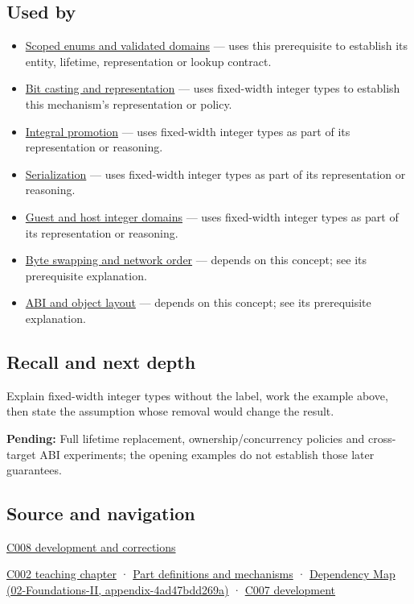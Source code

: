 \subsection{Used by}\label{used-by}

\begin{itemize}
\tightlist
\item
  \hyperref[appendix-23640fcee147]{Scoped enums and validated domains} --- uses this prerequisite to establish its entity, lifetime, representation or lookup contract.
\item
  \hyperref[appendix-34ee45f161c1]{Bit casting and representation} --- uses fixed-width integer types to establish this mechanism's representation or policy.
\item
  \hyperref[appendix-45303d03796a]{Integral promotion} --- uses fixed-width integer types as part of its representation or reasoning.
\item
  \hyperref[appendix-91d09ebed979]{Serialization} --- uses fixed-width integer types as part of its representation or reasoning.
\item
  \hyperref[appendix-33e7a011b684]{Guest and host integer domains} --- uses fixed-width integer types as part of its representation or reasoning.
\item
  \hyperref[appendix-11ba36693aa2]{Byte swapping and network order} --- depends on this concept; see its prerequisite explanation.
\item
  \hyperref[appendix-c4ac6bb0fff8]{ABI and object layout} --- depends on this concept; see its prerequisite explanation.
\end{itemize}

\subsection{Recall and next depth}\label{recall-and-next-depth}

Explain fixed-width integer types without the label, work the example above, then state the assumption whose removal would change the result.

\textbf{Pending:} Full lifetime replacement, ownership/concurrency policies and cross-target ABI experiments; the opening examples do not establish those later guarantees.

\subsection{Source and navigation}\label{source-and-navigation}

\hyperref[appendix-fd090d982a15]{C008 development and corrections}

\href{Continuous\%20Notes/Computing\%20Foundations\%20-\%20From\%20Bits\%20to\%20C++\%20and\%20Systems\%20APIs\#Arithmetic\%20becomes\%20a\%20policy}{C002 teaching chapter} · \hyperref[appendix-fd090d982a15]{Part definitions and mechanisms} · \href{}{Dependency Map (02-Foundations-II, appendix-4ad47bdd269a)} · \href{Continuous\%20Notes/Computing\%20Foundations\%20-\%20From\%20Bits\%20to\%20C++\%20and\%20Systems\%20APIs\#Choose\%20a\%20type\%20for\%20its\%20promise,\%20not\%20its\%20familiar\%20size}{C007 development}
